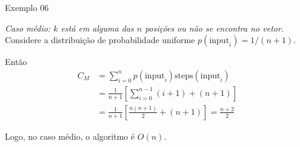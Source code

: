 \begin{frame}[fragile]{Exemplo 06}

	{\it Caso médio: $k$ está em alguma das $n$ posições ou não 
	se encontra no vetor.} Considere a distribuição de probabilidade
	{uniforme} $p(\mbox{input}_i) = 1/(n+1)$. 

    Então
	\begin{align*}
	C_M &= \sum_{i=0}^{n} p(\mbox{input}_i)\mbox{steps}(\mbox{input}_i) \\ 
	&= \frac{1}{n+1}\left[\sum_{i=0}^{n-1} (i+1) + (n+1) \right]\\ 
	&= \frac{1}{n+1}\left[\frac{n(n+1)}{2} + (n+1)\right]= 
	\frac{n+2}{2}
	\end{align*}

	Logo, no caso médio, o algoritmo é $O(n)$.

\end{frame}

